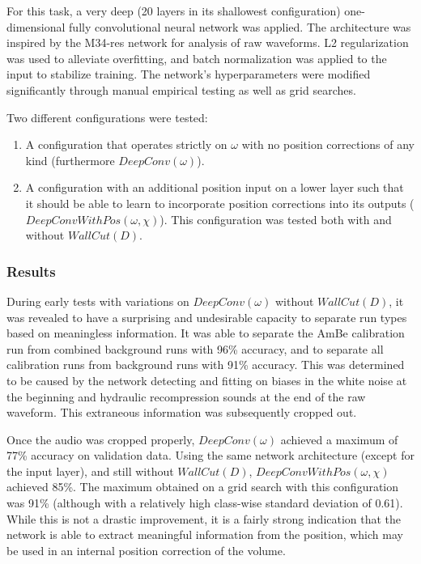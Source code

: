 \documentclass[10pt]{article}
\begin{document}
For this task, a very deep (20 layers in its shallowest configuration) one-dimensional fully convolutional neural network was applied. The architecture was inspired by the M34-res network \cite{verydeepconvnets} for analysis of raw waveforms. L2 regularization was used to alleviate overfitting, and batch normalization was applied to the input to stabilize training. The network's hyperparameters were modified significantly through manual empirical testing as well as grid searches.

Two different configurations were tested:
\begin{enumerate}
    \item A configuration that operates strictly on $\omega$ with no position corrections of any kind (furthermore $DeepConv(\omega)$).
    \item A configuration with an additional position input on a lower layer such that it should be able to learn to incorporate position corrections into its outputs ($DeepConvWithPos(\omega, \chi)$). This configuration was tested both with and without $WallCut(D)$.
\end{enumerate}

\subsubsection{Results}

During early tests with variations on $DeepConv(\omega)$ without $WallCut(D)$, it was revealed to have a surprising and undesirable capacity to separate run types based on meaningless information. It was able to separate the AmBe calibration run from combined background runs with 96\% accuracy, and to separate all calibration runs from background runs with 91\% accuracy. This was determined to be caused by the network detecting and fitting on biases in the white noise at the beginning and hydraulic recompression sounds at the end of the raw waveform. This extraneous information was subsequently cropped out.

Once the audio was cropped properly, $DeepConv(\omega)$ achieved a maximum of 77\% accuracy on validation data. Using the same network architecture (except for the input layer), and still without $WallCut(D)$, $DeepConvWithPos(\omega, \chi)$ achieved 85\%. The maximum obtained on a grid search with this configuration was 91\% (although with a relatively high class-wise standard deviation of 0.61). While this is not a drastic improvement, it is a fairly strong indication that the network is able to extract meaningful information from the position, which may be used in an internal position correction of the volume.
\end{document}
